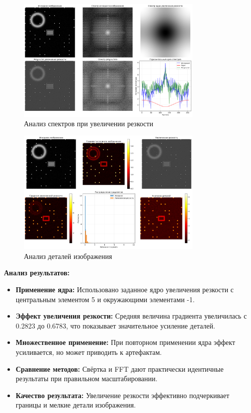 \begin{figure}[H]
    \centering
    \includegraphics[width=0.8\textwidth]{images/task3/spectrum_analysis.png}
    \caption{Анализ спектров при увеличении резкости}
    \label{fig:spectrum_analysis_sharp}
\end{figure}

\begin{figure}[H]
    \centering
    \includegraphics[width=0.8\textwidth]{images/task3/detail_analysis.png}
    \caption{Анализ деталей изображения}
    \label{fig:detail_analysis_sharp}
\end{figure}

\textbf{Анализ результатов:}
\begin{itemize}
    \item \textbf{Применение ядра:} Использовано заданное ядро увеличения резкости с центральным элементом 5 и окружающими элементами -1.
    
    \item \textbf{Эффект увеличения резкости:} Средняя величина градиента увеличилась с 0.2823 до 0.6783, что показывает значительное усиление деталей.
    
    \item \textbf{Множественное применение:} При повторном применении ядра эффект усиливается, но может приводить к артефактам.
    
    \item \textbf{Сравнение методов:} Свёртка и FFT дают практически идентичные результаты при правильном масштабировании.
    
    \item \textbf{Качество результата:} Увеличение резкости эффективно подчеркивает границы и мелкие детали изображения.
\end{itemize}

